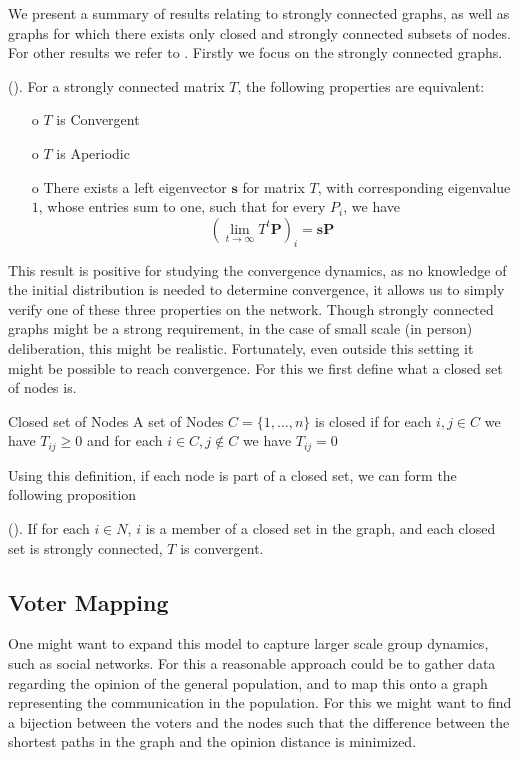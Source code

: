 We present a summary of results relating to strongly connected graphs, as well
as graphs for which there exists only closed and strongly connected subsets of
nodes. For other results we refer to \citet{golubNaiveLearningSocial2010}.
Firstly we focus on the strongly connected graphs.

\begin{proposition}{(\citet{golubNaiveLearningSocial2010}).} For a strongly
	connected matrix \(T\), the following properties are equivalent:
	\begin{itemize} \item[o] \(T\) is Convergent \item[o] \(T\) is
			Aperiodic \item[o] There exists a left eigenvector
			\(\boldsymbol{s}\) for matrix \(T\), with corresponding
			eigenvalue \(1\), whose entries sum to one, such that for every
			$P_i$, we have \[\left(\lim_{t\to \infty}T^{t}
				\boldsymbol{P}\right)_{i} = \boldsymbol{s}\boldsymbol{P}\]
	\end{itemize} \end{proposition}

This result is positive for studying the convergence dynamics, as no knowledge
of the initial distribution is needed to determine convergence, it allows us to
simply verify one of these three properties on the network. Though strongly
connected graphs might be a strong requirement, in the case of small scale (in
person) deliberation, this might be realistic. Fortunately, even outside this
setting it might be possible to reach convergence. For this we first define
what a closed set of nodes is.

\begin{definition}{Closed set of Nodes}{} A set of Nodes \(C = \{1, \dots,
	n\}\) is closed if for each \(i,j \in C\) we have $T_{ij} \geq 0$ and for each
	\(i \in C, j \notin C\) we have \(T_{ij} = 0\) \end{definition}

Using this definition, if each node is part of a closed set, we can form the
following proposition

\begin{proposition}{(\citet{golubNaiveLearningSocial2010}).} If for each \(i
	\in N\), \(i\) is a member of a closed set in the graph, and each closed set is
	strongly connected, \(T\) is convergent. \end{proposition}




\subsection{Voter Mapping} One might want to expand this model to capture
larger scale group dynamics, such as social networks. For this a reasonable
approach could be to gather data regarding the opinion of the general
population, and to map this onto a graph representing the communication in the
population.
For this we might want to find a bijection between the voters and the nodes such that
the difference between the shortest paths in the graph and the opinion distance is minimized.


